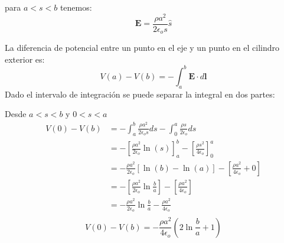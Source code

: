 \documentclass[12pt]{article}
\begin{document}
para \( a < s < b \) tenemos:
\[
\mathbf{E} = \frac{\rho a^2}{2\epsilon_o s }  \hat{s}
\]

La diferencia de potencial entre un punto en el eje y un punto en el cilindro exterior es:
\[
{V(a)}-{V(b)}   = -\int_{a}^{b} \mathbf{E}\cdot d \mathbf{l}  
\]
Dado el intervalo de integración se puede separar la integral en dos partes:

Desde  \(a < s < b\) y  \(0 < s <a\)
\begin{align*}
    {V(0)}-{V(b)}   &= -\int_{a}^{b} \frac{\rho a^2}{2\epsilon_o s } ds - \int_{0}^{a} \frac{\rho s}{2\epsilon_o } ds \\
    &= -\left[\frac{\rho a^2}{2\epsilon_o} \ln(s) \right]_{a}^{b} - \left[\frac{\rho s^2}{4\epsilon_o} \right]_{0}^{a} \\
    &= -\frac{\rho a^2}{2\epsilon_o} \left[\ln(b) -\ln(a)  \right] - \left[\frac{\rho a^2}{4\epsilon_o} + 0 \right] \\
    &= -\left[\frac{\rho a^2}{2\epsilon_o} \ln{\frac{b}{a} } \right] - \left[\frac{\rho a^2}{4\epsilon_o} \right] \\
    &= -\frac{\rho a^2}{2\epsilon_o} \ln{\frac{b}{a} } - \frac{\rho a^2}{4\epsilon_o}\\
\end{align*}
\[
\boxed{V(0)-V(b) =-\frac{\rho a^2}{4\epsilon_o} \left(2\ln{\frac{b}{a} } + 1 \right) }
\]
\end{document}
